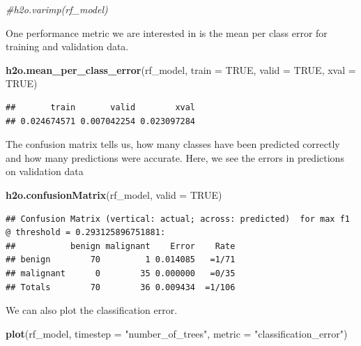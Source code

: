 \documentclass[]{article}
\newenvironment{Shaded}{\begin{snugshade}}{\end{snugshade}}
\newcommand{\KeywordTok}[1]{\textcolor[rgb]{0.13,0.29,0.53}{\textbf{{#1}}}}
\newcommand{\DataTypeTok}[1]{\textcolor[rgb]{0.13,0.29,0.53}{{#1}}}
\newcommand{\StringTok}[1]{\textcolor[rgb]{0.31,0.60,0.02}{{#1}}}
\newcommand{\CommentTok}[1]{\textcolor[rgb]{0.56,0.35,0.01}{\textit{{#1}}}}
\newcommand{\OtherTok}[1]{\textcolor[rgb]{0.56,0.35,0.01}{{#1}}}
\newcommand{\NormalTok}[1]{{#1}}
\begin{document}
\begin{Shaded}
\begin{Highlighting}[]
\CommentTok{#h2o.varimp(rf_model)}
\end{Highlighting}
\end{Shaded}

One performance metric we are interested in is the mean per class error
for training and validation data.

\begin{Shaded}
\begin{Highlighting}[]
\KeywordTok{h2o.mean_per_class_error}\NormalTok{(rf_model, }\DataTypeTok{train =} \OtherTok{TRUE}\NormalTok{, }\DataTypeTok{valid =} \OtherTok{TRUE}\NormalTok{, }\DataTypeTok{xval =} \OtherTok{TRUE}\NormalTok{)}
\end{Highlighting}
\end{Shaded}

\begin{verbatim}
##       train       valid        xval 
## 0.024674571 0.007042254 0.023097284
\end{verbatim}

The confusion matrix tells us, how many classes have been predicted
correctly and how many predictions were accurate. Here, we see the
errors in predictions on validation data

\begin{Shaded}
\begin{Highlighting}[]
\KeywordTok{h2o.confusionMatrix}\NormalTok{(rf_model, }\DataTypeTok{valid =} \OtherTok{TRUE}\NormalTok{)}
\end{Highlighting}
\end{Shaded}

\begin{verbatim}
## Confusion Matrix (vertical: actual; across: predicted)  for max f1 @ threshold = 0.293125896751881:
##           benign malignant    Error    Rate
## benign        70         1 0.014085   =1/71
## malignant      0        35 0.000000   =0/35
## Totals        70        36 0.009434  =1/106
\end{verbatim}

We can also plot the classification error.

\begin{Shaded}
\begin{Highlighting}[]
\KeywordTok{plot}\NormalTok{(rf_model,}
     \DataTypeTok{timestep =} \StringTok{"number_of_trees"}\NormalTok{,}
     \DataTypeTok{metric =} \StringTok{"classification_error"}\NormalTok{)}
\end{Highlighting}
\end{Shaded}
\end{document}
